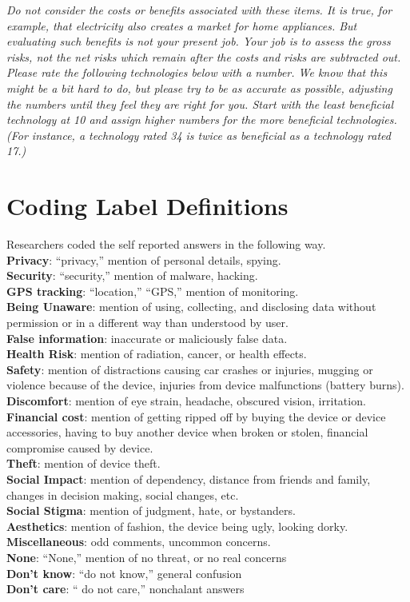 \textit{Do not consider the costs or benefits associated with these items. It is true, for example, that electricity also creates a market for home appliances. But evaluating such benefits is not your present job. Your job is to assess the gross risks, not the net risks which remain after the costs and risks are subtracted out.} \\[-.6cm]

\textit{Please rate the following technologies below with a number. We know that this might be a bit hard to do, but please try to be as accurate as possible, adjusting the numbers until they feel they are right for you. Start with the least beneficial technology at 10 and assign higher numbers for the more beneficial technologies. (For instance, a technology rated 34 is twice as beneficial as a technology rated 17.)}

\section{Coding Label Definitions}
\label{sec:coding}
Researchers coded the self reported answers in the following way.\\

{\bf Privacy}: ``privacy,'' mention of personal details, spying. \\
{\bf Security}:  ``security,'' mention of malware, hacking. \\
{\bf GPS tracking}: ``location,'' ``GPS,'' mention of monitoring. \\
{\bf Being Unaware}: mention of using, collecting, and disclosing data without permission or in a different way than understood by user. \\
{\bf False information}: inaccurate or maliciously false data.\\
{\bf Health Risk}: mention of radiation, cancer, or health effects.\\
{\bf Safety}: mention of distractions causing car crashes or injuries, mugging or violence because of the device, injuries from device malfunctions (battery burns).\\
{\bf Discomfort}: mention of eye strain, headache, obscured vision, irritation. \\
{\bf Financial cost}: mention of getting ripped off by buying the device or device accessories, having to buy another device when broken or stolen, financial compromise caused by device. \\
{\bf Theft}: mention of device theft. \\
{\bf Social Impact}: mention of dependency, distance from friends and family, changes in decision making, social changes, etc. \\
{\bf Social Stigma}: mention of judgment, hate, or bystanders.\\ 
{\bf Aesthetics}: mention of fashion, the device being ugly, looking dorky. \\
{\bf Miscellaneous}: odd comments, uncommon concerns. \\
{\bf None}: ``None,'' mention of no threat, or no real concerns \\
{\bf Don't know}: ``do not know,'' general confusion \\
{\bf Don't care}: `` do not care,'' nonchalant answers 


